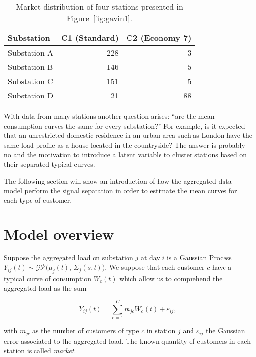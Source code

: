 \begin{table}[b]
    \caption[table]{Market distribution of four stations presented in Figure~\ref{fig:gavin1}.}
    \centering
\begin{knitrout}
\color{fgcolor}
\begin{tabular}{lrr}
\toprule
Substation & C1 (Standard) & C2 (Economy 7)\\
\midrule
Substation A & 228 & 3\\
Substation B & 146 & 5\\
Substation C & 151 & 5\\
Substation D & 21 & 88\\
\bottomrule
\end{tabular}


\end{knitrout}
    \label{tab:gavin1}
\end{table}

With data from many stations another question arises: ``are the mean consumption curves the same for every substation?'' For example, is it expected that an unrestricted domestic residence in an urban area such as London have the same load profile as a house located in the countryside? The answer is probably no and the motivation to introduce a latent variable to cluster stations based on their separated typical curves.

The following section will show an introduction of how the aggregated data model perform the signal separation in order to estimate the mean curves for each type of customer.

\section{Model overview}
\label{sec:overview}

Suppose the aggregated load on substation $j$ at day $i$ is a Gaussian Process $Y_{ij}(t) \sim \mathcal{GP}\bigl(\mu_j(t),\, \Sigma_j(s,t)\bigr)$. We suppose that each customer $c$ have a typical curve of consumption $W_c(t)$ which allow us to comprehend the aggregated load as the sum

\begin{equation}
    Y_{ij}(t) = \sum_{c=1}^C m_{jc} W_c(t) + \varepsilon_{ij},
\end{equation}

\noindent with $m_{jc}$ as the number of customers of type $c$ in station $j$ and $\varepsilon_{ij}$ the Gaussian error associated to the aggregated load. The known quantity of customers in each station is called \textit{market}.

